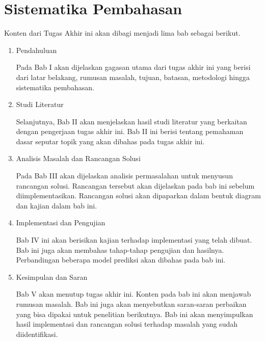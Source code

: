 \section{Sistematika Pembahasan}

Konten dari Tugas Akhir ini akan dibagi menjadi lima bab sebagai berikut.
\begin{enumerate}
    \item Pendahuluan
    
    Pada Bab I akan dijelaskan gagasan utama dari tugas akhir ini yang berisi dari latar belakang, rumusan masalah, tujuan, batasan, metodologi hingga sistematika pembahasan.

    \item Studi Literatur
    
    Selanjutnya, Bab II akan menjelaskan hasil studi literatur yang berkaitan dengan pengerjaan tugas akhir ini. Bab II ini berisi tentang pemahaman dasar seputar topik yang akan dibahas pada tugas akhir ini.

    \item Analisis Masalah dan Rancangan Solusi
    
    Pada Bab III akan dijelaskan analisis permasalahan untuk menyusun rancangan solusi. Rancangan tersebut akan dijelaskan pada bab ini sebelum diimplementasikan. Rancangan solusi akan dipaparkan dalam bentuk diagram dan kajian dalam bab ini.

    \item Implementasi dan Pengujian
    
    Bab IV ini akan berisikan kajian terhadap implementasi yang telah dibuat. Bab ini juga akan membahas tahap-tahap pengujian dan hasilnya. Perbandingan beberapa model prediksi akan dibahas pada bab ini.

    \item Kesimpulan dan Saran
    
    Bab V akan menutup tugas akhir ini. Konten pada bab ini akan menjawab rumusan masalah. Bab ini juga akan menyebutkan saran-saran perbaikan yang bisa dipakai untuk penelitian berikutnya. Bab ini akan menyimpulkan hasil implementasi dan rancangan solusi terhadap masalah yang sudah diidentifikasi.
\end{enumerate}